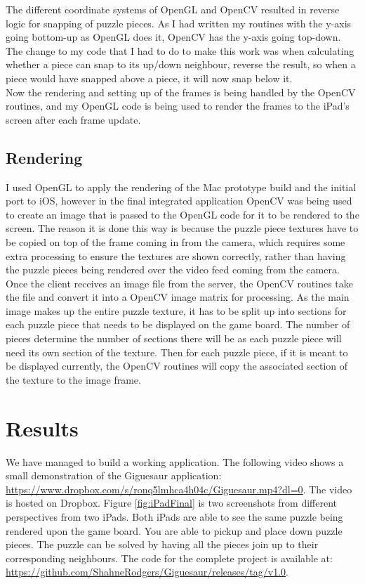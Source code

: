 \documentclass{article}
\begin{document}
The different coordinate systems of OpenGL and OpenCV resulted in reverse logic
for snapping of puzzle pieces. As I had written my routines with the y-axis
going bottom-up as OpenGL does it, OpenCV has the y-axis going top-down. The
change to my code that I had to do to make this work was when calculating
whether a piece can snap to its up/down neighbour, reverse the result, so when a
piece would have snapped above a piece, it will now snap below it.\\

Now the rendering and setting up of the frames is being handled by the OpenCV
routines, and my OpenGL code is being used to render the frames to the iPad's
screen after each frame update. 

\subsection{Rendering}
I used OpenGL to apply the rendering of the Mac prototype build and the initial
port to iOS, however in the final integrated application OpenCV was being used
to create an image that is passed to the OpenGL code for it to be rendered to
the screen. The reason it is done this way is because the puzzle piece textures
have to be copied on top of the frame coming in from the camera, which requires
some extra processing to ensure the textures are shown correctly, rather than
having the puzzle pieces being rendered over the video feed coming from the
camera. Once the client receives an image file from the server, the OpenCV
routines take the file and convert it into a OpenCV image matrix for
processing. As the main image makes up the entire puzzle texture, it has to be
split up into sections for each puzzle piece that needs to be displayed on the
game board. The number of pieces determine the number of sections there will be
as each puzzle piece will need its own section of the texture. Then for each
puzzle piece, if it is meant to be displayed currently, the OpenCV routines will
copy the associated section of the texture to the image frame.


\section{Results}
We have managed to build a working application. The following video shows a
small demonstration of the Giguesaur application:
\url{https://www.dropbox.com/s/ronq5lmhca4h04c/Giguesaur.mp4?dl=0}. The video is
hosted on Dropbox. Figure \ref{fig:iPadFinal} is two screenshots from different
perspectives from two iPads. Both iPads are able to see the same puzzle being
rendered upon the game board. You are able to pickup and place down puzzle
pieces. The puzzle can be solved by having all the pieces join up to their
corresponding neighbours. The code for the complete project is available at:
\url{https://github.com/ShahneRodgers/Giguesaur/releases/tag/v1.0}.
\end{document}
